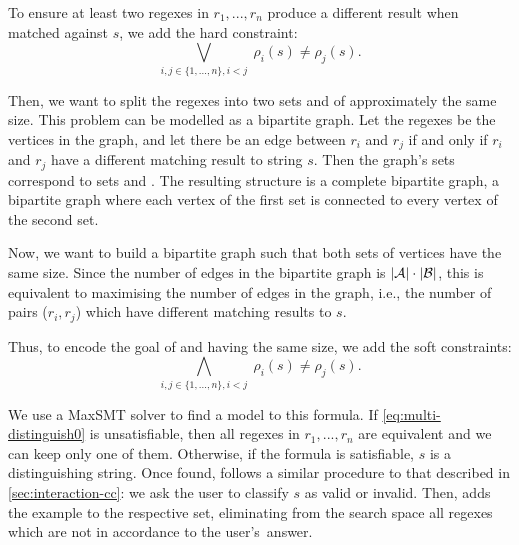 To ensure at least two regexes in \(r_1, ..., r_n\) produce a different result when matched against \(s\), we add the hard constraint:
\begin{equation}\label{eq:multi-distinguish0}
    \bigvee_{i,j \in \{1, ..., n\}, i<j} \; \rho_i(s) \ne \rho_j(s).
\end{equation}

\noindent
Then, we want to split the regexes into two sets  and  of approximately the same size. This problem can be modelled as a bipartite graph. Let the regexes be the vertices in the graph, and let there be an edge between \(r_i\) and \(r_j\) if and only if \(r_i\) and \(r_j\) have a different matching result to string \(s\). Then the graph's sets correspond to sets  and . The resulting structure is a complete bipartite graph, a bipartite graph where each vertex of the first set is connected to every vertex of the second set.

Now, we want to build a bipartite graph such that both sets of vertices have the same size. Since the number of edges in the bipartite graph is \(|{\mathcal{A}}| \cdot |{\mathcal{B}}|\), this is equivalent to maximising the number of edges in the graph, i.e., the number of pairs (\(r_i, r_j\)) which have different matching results to \(s\).

Thus, to encode the goal of  and  having the same size, we add the soft constraints:
\begin{equation}\label{eq:multi-distinguish}
    \bigwedge_{i,j \in \{1, ..., n\}, i<j} \; \rho_i(s) \ne \rho_j(s).
\end{equation}

We use a \ac{MaxSMT} solver to find a model to this formula. If  \eqref{eq:multi-distinguish0} is unsatisfiable, then all regexes in \(r_1, ..., r_n\) are equivalent and we can keep only one of them. Otherwise, if the formula is satisfiable, \(s\) is a distinguishing string. Once found, \Forest{} follows a similar procedure to that described in \autoref{sec:interaction-cc}: we ask the user to classify \(s\) as valid or invalid. Then, \Forest{} adds the example to the respective set, eliminating from the search space all regexes which are not in accordance to the user's~answer. 


